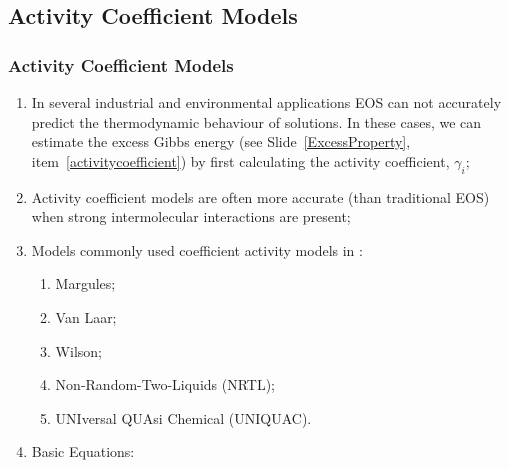 \documentclass[10pt,compress,handout,ignorenonframetext,unknownkeysallowed]{beamer}
\begin{document}
\subsection{Activity Coefficient Models}

\begin{frame}
  \frametitle{Activity Coefficient Models}
  \begin{enumerate}%
      \item<1-> In several industrial and environmental applications EOS can not accurately predict the thermodynamic behaviour of solutions. In these cases, we can estimate the excess Gibbs energy  (see Slide~\ref{ExcessProperty}, item~\ref{activitycoefficient}) by first calculating the activity coefficient, $\gamma_{i}$;
      \item<2-> Activity coefficient models are often more accurate (than traditional EOS) when strong intermolecular interactions are present;
      \item<3-> Models commonly used coefficient activity models in :
          \begin{enumerate}
             \item<3-> Margules;
             \item<3-> Van Laar;
             \item<3-> Wilson;
             \item<3-> Non-Random-Two-Liquids (NRTL);
             \item<3-> UNIversal QUAsi Chemical (UNIQUAC).     
          \end{enumerate}
      \item<4-> Basic Equations:
  \end{enumerate}
\end{frame}
\normalsize
\end{document}
